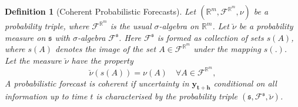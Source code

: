 \documentclass[a4paper, 11pt]{article}
\newtheorem{definition}{Definition}[section]
\begin{document}
\begin{definition}[Coherent Probabilistic Forecasts]\label{def:cohprob}
  Let $(\mathbb{R}^m, \mathscr{F}^{\mathbb{R}^m}, \nu)$ be a probability triple, where $\mathscr{F}^{\mathbb{R}^m}$ is the usual $\sigma$-algebra on $\mathbb{R}^m$. Let $\breve{\nu}$ be a probability measure on $\mathfrak{s}$ with $\sigma$-algebra $\mathscr{F}^{\mathfrak{s}}$.  Here $\mathscr{F}^{\mathfrak{s}}$ is formed as collection of sets $s(A)$, where $s(A)$ denotes the image of the set $A\in \mathscr{F}^{\mathbb{R}^m}$ under the mapping $s(.)$.  Let the measure $\breve{\nu}$ have the property
  $$
      \breve{\nu}(s(A)) = \nu(A) \quad \forall  A \in \mathscr{F}^{\mathbb{R}^m},
    $$  
  A probabilistic forecast is coherent if uncertainty in $\bm{y_{t+h}}$ conditional on all information up to time $t$ is characterised by the probability triple $(\mathfrak{s},\mathscr{F}^{\mathfrak{s}},\breve{\nu})$.
\end{definition}



\end{document}

